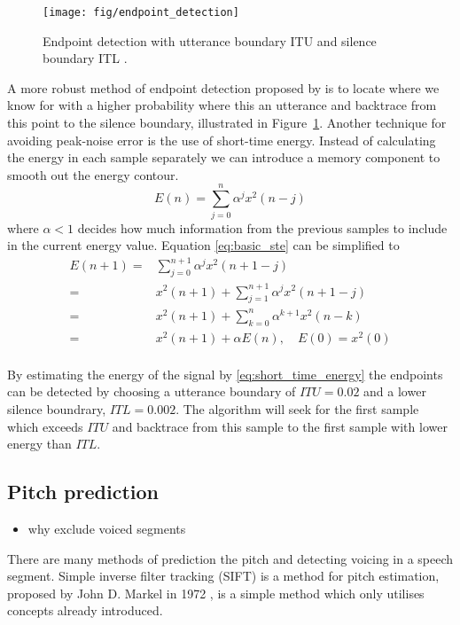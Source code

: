 \begin{figure}[htbp]
	\begin{center}
		\texttt{[image: fig/endpoint\_detection]}
		\caption{Endpoint detection with utterance boundary ITU and silence boundary ITL \cite{rabiner75}.}
		\label{fig:endpoint_detection}
	\end{center}
\end{figure}

A more robust method of endpoint detection proposed by \cite{rabiner75} is to locate where we know for with a higher probability where this an utterance and backtrace from this point to the silence boundary, illustrated in Figure~\ref{fig:endpoint_detection}. Another technique for avoiding peak-noise error is the use of short-time energy. Instead of calculating the energy in each sample separately we can introduce a memory component to smooth out the energy contour.
\begin{equation}
	E(n)=\sum_{j=0}^{n}\alpha^j x^2(n-j)
	\label{eq:basic_ste}
\end{equation}
where $\alpha < 1$ decides how much information from the previous samples to include in the current energy value. Equation \eqref{eq:basic_ste} can be simplified to
\begin{equation}
	\begin{split}
		E(n+1)=& \sum_{j=0}^{n+1}\alpha^jx^2(n+1-j)\\
		=& x^2(n+1)+\sum_{j=1}^{n+1}\alpha^jx^2(n+1-j)\\
		=& x^2(n+1)+\sum_{k=0}^{n}\alpha^{k+1} x^2(n-k)\\
		=& x^2(n+1)+\alpha E(n), \quad E(0)=x^2(0)\\
	\end{split}
	\label{eq:short_time_energy}
\end{equation}

By estimating the energy of the signal by \eqref{eq:short_time_energy} the endpoints can be detected by choosing a utterance boundary of \eg $ITU=0.02$ and a lower silence boundrary, \eg $ITL=0.002$. The algorithm will seek for the first sample which exceeds $ITU$ and backtrace from this sample to the first sample with lower energy than $ITL$.

\subsection{Pitch prediction} %
\label{sub:detection_of_voicing}
\begin{itemize}
	\item why exclude voiced segments
\end{itemize}
There are many methods of prediction the pitch and detecting voicing in a speech segment. Simple inverse filter tracking (SIFT) is a method for pitch estimation, proposed by John D. Markel in 1972 \cite{markel72}, is a simple method which only utilises concepts already introduced. 

